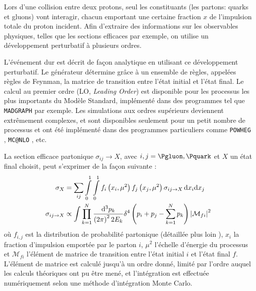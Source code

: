 Lors d'une collision entre deux protons, seul les constituants (les partons: quarks et gluons) vont interagir, chacun emportant une certaine fraction $x$ de l'impulsion totale du proton incident. Afin d'extraire des informations sur les observables physiques, telles que les sections efficaces par exemple, on utilise un développement perturbatif à plusieurs ordres.

L'événement dur est décrit de façon analytique en utilisant ce développement perturbatif. Le générateur détermine grâce à un ensemble de règles, appelées règles de Feynman, la matrice de transition entre l'état initial et l'état final. Le calcul au premier ordre (LO, \emph{Leading Order}) est disponible pour les processus les plus importants du Modèle Standard, implémenté dans des programmes tel que \texttt{MADGRAPH} \citep{madgraph} par exemple. Les simulations aux ordres supérieurs deviennent extrêmement complexes, et sont disponibles seulement pour un petit nombre de processus et ont été implémenté dans des programmes particuliers comme \texttt{POWHEG} \citep{Alioli:2010xd}, \texttt{MC@NLO} \citep{1126-6708-2002-06-029}, etc.

La section efficace partonique $\sigma_{ij} \rightarrow X$, avec $i, j = \Pgluon, \Pquark$ et $X$ un état final choisit, peut s'exprimer de la façon suivante :
\begin{align}
  \sigma_{X} &= \sum_{ij} \int \displaylimits_0^1 \int \displaylimits_0^1 f_i\left( x_i, \mu^2 \right) f_j\left(x_j, \mu^2\right) \sigma_{ij \rightarrow X}\, \mathrm{d}x_i \mathrm{d}x_j \notag \\
  \sigma_{ij \rightarrow X} &\propto \int \prod \displaylimits_{k = 1}^{N} \frac{\mathrm{d}^3p_k}{\left( 2 \pi \right)^2 2 E_k} \delta^4\left( p_i + p_j - \sum_{k = 1}^{N} p_k \right) \left| \mathcal{M}_{fi} \right|^2 \label{eq:section_efficace}
\end{align}
où $f_{i, j}$ est la distribution de probabilité partonique (détaillée plus loin ), $x_i$ la fraction d'impulsion emportée par le parton $i$, $\mu^2$ l'échelle d'énergie du processus et $\mathcal{M}_{fi}$ l'élément de matrice de transition entre l'état initial $i$ et l'état final $f$. L'élément de matrice est calculé jusqu'à un ordre donné, limité par l'ordre auquel les calculs théoriques ont pu être mené, et l'intégration est effectuée numériquement selon une méthode d'intégration Monte Carlo.

